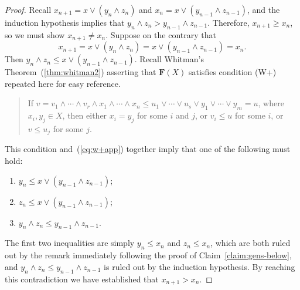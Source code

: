 \begin{proof}
Recall $x_{n+1} = x \vee (y_n \wedge z_n)$ and 
$x_{n} = x \vee (y_{n-1} \wedge z_{n-1})$, and 
the induction hypothesis implies that $y_n \wedge z_n > y_{n-1} \wedge z_{n-1}$.
Therefore, 
$x_{n+1} \geq x_{n}$, so we must show $x_{n+1} \neq x_{n}$.  
Suppose on the contrary that 
\begin{equation}\label{eq:w+app}
x_{n+1} = x \vee (y_n \wedge z_n) = x \vee (y_{n-1} \wedge z_{n-1}) = x_n.
\end{equation}
Then $y_n \wedge z_n \leq x \vee (y_{n-1} \wedge z_{n-1})$.  
Recall Whitman's Theorem~(\ref{thm:whitman2}) asserting that 
$\mathbf{F}(X)$ satisfies condition (W+) repeated here for easy reference.
\begin{quote}  
  If $v = v_1 \wedge \cdots \wedge v_r \wedge x_1 \wedge \cdots
  \wedge x_n \leqslant u_1 \vee \cdots \vee u_s \vee
  y_1 \vee \cdots \vee y_m = u$, where $x_i, y_j\in X$, then either 
  $x_i = y_j$ for some $i$ and $j$, or $v_i \leqslant u$ for some $i$, or
  $v \leqslant u_j$ for some $j$. 
\end{quote}  
This condition and~(\ref{eq:w+app}) together imply that one of the following must hold:
\begin{enumerate}
\item $y_n \leq x \vee (y_{n-1} \wedge z_{n-1})$;
\item $z_n \leq x \vee (y_{n-1} \wedge z_{n-1})$;
\item $y_n \wedge z_n \leq y_{n-1} \wedge z_{n-1}$.  
\end{enumerate}
The first two inequalities are simply $y_n \leq x_n$ and $z_n \leq x_n$,
which are both ruled out by the remark immediately following the proof of Claim~\ref{claim:gens-below},
and $y_n \wedge z_n \leq y_{n-1} \wedge z_{n-1}$ is ruled out by the induction hypothesis.
By reaching this contradiction we have established that $x_{n+1} > x_n$.  


\end{proof}
